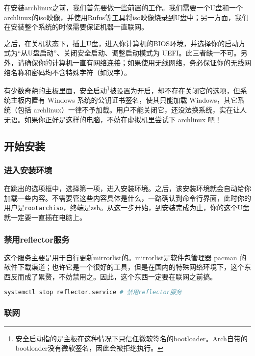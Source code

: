 \documentclass[../main.tex]{subfiles}
\begin{document}
在安装archlinux之前，我们首先要做一些前置的工作。我们需要一个U盘和一个archlinux的iso映像，并使用Rufus等工具将iso映像烧录到U盘中；另一方面，我们在安装整个系统的时候需要保证机器一直联网。

之后，在关机状态下，插上U盘，进入你计算机的BIOS环境，并选择你的启动方式为“从U盘启动”、关闭安全启动、调整启动模式为 UEFI。此三者缺一不可。另外，请确保你的计算机一直有网络连接；如果使用无线网络，务必保证你的无线网络名称和密码均不含特殊字符（如汉字）。

\begin{tcolorbox}[title=说明]
  有少数奇葩的主板里面，安全启动\footnote{安全启动指的是主板在这种情况下只信任微软签名的bootloader。Arch自带的bootloader没有微软签名，因此会被拒绝执行。}被设置为开启，却不存在关闭它的选项，但系统主板内置有 Windows 系统的公钥证书签名，使其只能加载 Windows，其它系统（包括 archlinux）一律不予加载。用户不能关闭它，还没法换系统，实在让人无语。如果你正好是这样的电脑，不妨在虚拟机里尝试下 archlinux 吧！
\end{tcolorbox}

\subsection{开始安装}

\subsubsection{进入安装环境}

在跳出的选项框中，选择第一项，进入安装环境。之后，该安装环境就会自动给你加载一些内容。不需要管这些内容具体是什么，一路确认到命令行界面，此时你的用户是\texttt{root\@ archiso}，终端是zsh。从这一步开始，到安装完成为止，你的这个U盘就一定要一直插在电脑上。

\subsubsection{禁用reflector服务}

这个服务主要是用于自行更新mirrorlist的。mirrorlist是软件包管理器 pacman 的软件下载渠道；也许它是一个很好的工具，但是在国内的特殊网络环境下，这个东西反而成了累赘，不妨禁用之。因此，这个东西一定要在联网之前搞。

\begin{lstlisting}[language=bash]
  systemctl stop reflector.service # 禁用reflector服务
\end{lstlisting}

\subsubsection{联网}
\end{document}
